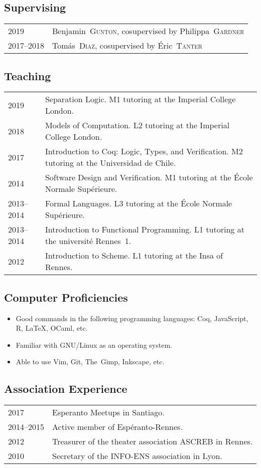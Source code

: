 \documentclass[12pt,a4paper]{article}
\makeatletter
\newcommand{\fr}[1]{\foreignlanguage{french}{{#1}}}
\newcommand{\es}[1]{\foreignlanguage{spanish}{{#1}}}
\newcommand{\fr}[1]{\foreignlanguage{francais}{{#1}}}
\newcommand{\es}[1]{\foreignlanguage{spanish}{{#1}}}
\newenvironment{datecvsection}[1]%
               {\subsection*{#1}%
                 \noindent \begin{tabular}{@{}p{\annee}p{\texte}@{}}}
               {\end{tabular}}
\newenvironment{itemcvsection}[1]%
               {\subsection*{#1}\begin{itemize}}
               {\end{itemize}}
\newcommand\familyName{\textsc}
\newcommand\placeName{}
\makeatother
\begin{document}
\begin{datecvsection}{Supervising}

    2019 & Benjamin~\familyName{Gunton}, cosupervised by Philippa~\familyName{Gardner} \\
    2017–2018 & Tomás~\familyName{Diaz}, cosupervised by Éric~\familyName{Tanter} \\

\end{datecvsection}

\begin{datecvsection}{Teaching}

    2019 & Separation Logic. M1 tutoring at the Imperial College London. \\

    2018 & Models of Computation. L2 tutoring at the Imperial College London. \\

    2017 & Introduction to Coq: Logic, Types, and Verification. M2 tutoring at the \es{\placeName{Universidad de Chile}}. \\

    2014 & Software Design and Verification. M1 tutoring at the \fr{\placeName{École Normale Supérieure}}. \\

    2013–2014 & Formal Languages. L3 tutoring at the \fr{\placeName{École Normale Supérieure}}. \\

    2013–2014 & Introduction to Functional Programming. L1 tutoring at the \fr{université \placeName{Rennes}~1}. \\

    2012 & Introduction to Scheme. L1 tutoring at the \placeName{Insa} of \placeName{Rennes}. \\

\end{datecvsection}

\begin{itemcvsection}{Computer Proficiencies}

	\item Good commands in the following programming languages:  Coq, JavaScript, R, \LaTeX, OCaml, etc.
	\item Familiar with GNU/Linux as an operating system.
	\item Able to use Vim, Git, The~Gimp, Inkscape, etc.

\end{itemcvsection}

\begin{datecvsection}{Association Experience}

    2017 & Esperanto Meetups in \placeName{Santiago}. \\
    2014–2015 & Active member of {Espéranto-Rennes}. \\
	2012 & Treasurer of the theater association {ASCREB} in \placeName{Rennes}. \\
	2010 & Secretary of the \textsc{INFO-ENS} association in \placeName{Lyon}. \\

\end{datecvsection}
\end{document}
